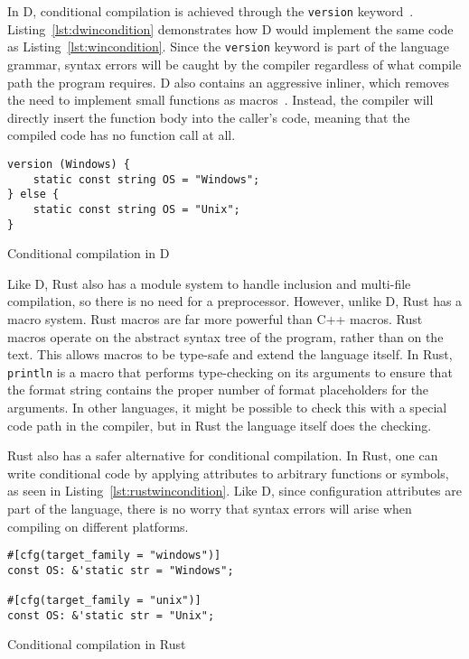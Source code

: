 \documentclass[finalcopy]{srpaper}
\begin{document}
In D, conditional compilation is achieved through the \texttt{version}
keyword~\cite{Armaly:2007:DPL:1234292.1234301}. Listing~\ref{lst:dwincondition}
demonstrates how D would implement the same code as
Listing~\ref{lst:wincondition}. Since the \texttt{version} keyword is part of
the language grammar, syntax errors will be caught by the compiler regardless
of what compile path the program requires. D also contains an aggressive
inliner, which removes the need to implement small functions as
macros~\cite{pretod}. Instead, the compiler will directly insert the function
body into the caller's code, meaning that the compiled code has no function
call at all.

\begin{listing}[H]
\begin{verbatim}
version (Windows) {
    static const string OS = "Windows";
} else {
    static const string OS = "Unix";
}
\end{verbatim}
\caption{Conditional compilation in D}
\label{lst:dwincondition}
\end{listing}

Like D, Rust also has a module system to handle inclusion and multi-file
compilation, so there is no need for a preprocessor. However, unlike D, Rust
has a macro system. Rust macros are far more powerful than C++ macros. Rust
macros operate on the abstract syntax tree of the program, rather than on the
text. This allows macros to be type-safe and extend the language itself. In
Rust, \texttt{println} is a macro that performs type-checking on its arguments
to ensure that the format string contains the proper number of format
placeholders for the arguments. In other languages, it might be possible to
check this with a special code path in the compiler, but in Rust the language
itself does the checking.

Rust also has a safer alternative for conditional compilation. In Rust, one can
write conditional code by applying attributes to arbitrary functions or
symbols, as seen in Listing~\ref{lst:rustwincondition}. Like D, since
configuration attributes are part of the language, there is no worry that
syntax errors will arise when compiling on different platforms.

\begin{listing}[H]
\begin{verbatim}
#[cfg(target_family = "windows")]
const OS: &'static str = "Windows";

#[cfg(target_family = "unix")]
const OS: &'static str = "Unix";
\end{verbatim}
\caption{Conditional compilation in Rust}
\label{lst:rustwincondition}
\end{listing}
\end{document}
